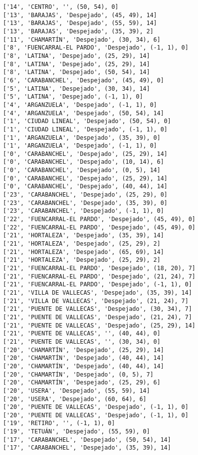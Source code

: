 \documentclass[11pt]{article}
\begin{document}
\begin{Verbatim}[commandchars=\\\{\}]
['14', 'CENTRO', '', (50, 54), 0]
['13', 'BARAJAS', 'Despejado', (45, 49), 14]
['13', 'BARAJAS', 'Despejado', (55, 59), 14]
['13', 'BARAJAS', 'Despejado', (35, 39), 2]
['11', 'CHAMARTÍN', 'Despejado', (30, 34), 6]
['8', 'FUENCARRAL-EL PARDO', 'Despejado', (-1, 1), 0]
['8', 'LATINA', 'Despejado', (25, 29), 14]
['8', 'LATINA', 'Despejado', (25, 29), 14]
['8', 'LATINA', 'Despejado', (50, 54), 14]
['6', 'CARABANCHEL', 'Despejado', (45, 49), 0]
['5', 'LATINA', 'Despejado', (30, 34), 14]
['5', 'LATINA', 'Despejado', (-1, 1), 0]
['4', 'ARGANZUELA', 'Despejado', (-1, 1), 0]
['4', 'ARGANZUELA', 'Despejado', (50, 54), 14]
['1', 'CIUDAD LINEAL', 'Despejado', (50, 54), 0]
['1', 'CIUDAD LINEAL', 'Despejado', (-1, 1), 0]
['1', 'ARGANZUELA', 'Despejado', (35, 39), 0]
['1', 'ARGANZUELA', 'Despejado', (-1, 1), 0]
['0', 'CARABANCHEL', 'Despejado', (25, 29), 14]
['0', 'CARABANCHEL', 'Despejado', (10, 14), 6]
['0', 'CARABANCHEL', 'Despejado', (0, 5), 14]
['0', 'CARABANCHEL', 'Despejado', (25, 29), 14]
['0', 'CARABANCHEL', 'Despejado', (40, 44), 14]
['23', 'CARABANCHEL', 'Despejado', (25, 29), 0]
['23', 'CARABANCHEL', 'Despejado', (35, 39), 0]
['23', 'CARABANCHEL', 'Despejado', (-1, 1), 0]
['22', 'FUENCARRAL-EL PARDO', 'Despejado', (45, 49), 0]
['22', 'FUENCARRAL-EL PARDO', 'Despejado', (45, 49), 0]
['21', 'HORTALEZA', 'Despejado', (35, 39), 14]
['21', 'HORTALEZA', 'Despejado', (25, 29), 2]
['21', 'HORTALEZA', 'Despejado', (65, 69), 14]
['21', 'HORTALEZA', 'Despejado', (25, 29), 2]
['21', 'FUENCARRAL-EL PARDO', 'Despejado', (18, 20), 7]
['21', 'FUENCARRAL-EL PARDO', 'Despejado', (21, 24), 7]
['21', 'FUENCARRAL-EL PARDO', 'Despejado', (-1, 1), 0]
['21', 'VILLA DE VALLECAS', 'Despejado', (35, 39), 14]
['21', 'VILLA DE VALLECAS', 'Despejado', (21, 24), 7]
['21', 'PUENTE DE VALLECAS', 'Despejado', (30, 34), 7]
['21', 'PUENTE DE VALLECAS', 'Despejado', (21, 24), 7]
['21', 'PUENTE DE VALLECAS', 'Despejado', (25, 29), 14]
['21', 'PUENTE DE VALLECAS', '', (40, 44), 0]
['21', 'PUENTE DE VALLECAS', '', (30, 34), 0]
['20', 'CHAMARTÍN', 'Despejado', (25, 29), 14]
['20', 'CHAMARTÍN', 'Despejado', (40, 44), 14]
['20', 'CHAMARTÍN', 'Despejado', (40, 44), 14]
['20', 'CHAMARTÍN', 'Despejado', (0, 5), 7]
['20', 'CHAMARTÍN', 'Despejado', (25, 29), 6]
['20', 'USERA', 'Despejado', (55, 59), 14]
['20', 'USERA', 'Despejado', (60, 64), 6]
['20', 'PUENTE DE VALLECAS', 'Despejado', (-1, 1), 0]
['20', 'PUENTE DE VALLECAS', 'Despejado', (-1, 1), 0]
['19', 'RETIRO', '', (-1, 1), 0]
['19', 'TETUÁN', 'Despejado', (55, 59), 0]
['17', 'CARABANCHEL', 'Despejado', (50, 54), 14]
['17', 'CARABANCHEL', 'Despejado', (35, 39), 14]

\end{Verbatim}
\end{document}
